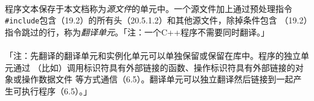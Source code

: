 

\paragraph{}
程序文本保存于本文档称为\textit{源文件}的单元中。一个源文件加上通过预处理指令
\texttt{\#include}包含（19.2）的所有头（20.5.1.2）和其他源文件，除掉条件包含
（19.2）指令跳过的行，称为\textit{翻译单元}。「注：一个C++程序不需要同时翻译。」

\paragraph{}
「注：先翻译的翻译单元和实例化单元可以单独保留或保留在库中。程序的独立单元通过
（比如）调用标识符具有外部链接的函数、操作标识符具有外部链接的对象或操作数据文件
等方式通信（6.5）。翻译单元可以独立翻译然后链接到一起产生可执行程序（6.5）。」


